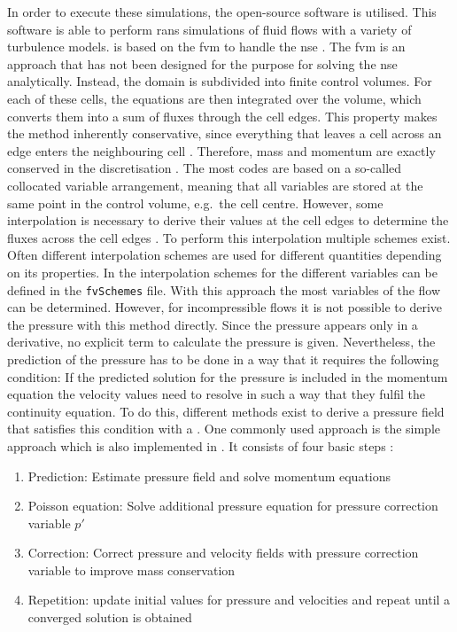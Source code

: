 In order to execute these simulations, the open-source software  is utilised. 
This software is able to perform \acrshort{rans} simulations of fluid flows with a variety of turbulence models. 
 is based on the \acrfull{fvm} to handle the \acrshort{nse} \citep{weller_tensorial_1998}.
The \acrshort{fvm} is an approach that has not been designed for the purpose for solving the \acrshort{nse} analytically. 
Instead, the domain is subdivided into finite control volumes.
For each of these cells, the equations are then integrated over the volume, which converts them into a sum of fluxes through the cell edges.
This property makes the method inherently conservative, since everything that leaves a cell across an edge enters the neighbouring cell \citep{moukalled_finite_2016}. 
Therefore, mass and momentum are exactly conserved in the discretisation \citep{weller_tensorial_1998}.
The most codes are based on a so-called collocated variable arrangement, meaning that all variables are stored at the same point in the control volume, e.g.~the cell centre.
However, some interpolation is necessary to derive their values at the cell edges to determine the fluxes across the cell edges \citep{schlatter_lecture_2025}.
To perform this interpolation multiple schemes exist.
Often different interpolation schemes are used for different quantities depending on its properties.
In  the interpolation schemes for the different variables can be defined in the \texttt{fvSchemes} file.
With this approach the most variables of the flow can be determined.
However, for incompressible flows it is not possible to derive the pressure with this method directly.
Since the pressure appears only in a derivative, no explicit term to calculate the pressure is given.
Nevertheless, the prediction of the pressure has to be done in a way that it requires the following condition:
If the predicted solution for the pressure is included in the momentum equation the velocity values need to resolve in such a way that they fulfil the continuity equation.
To do this, different methods exist to derive a pressure field that satisfies this condition with a  \citep{schlatter_lecture_2025, weller_tensorial_1998}.
One commonly used approach is the \acrfull{simple} approach which is also implemented in .
It consists of four basic steps \citep{schlatter_lecture_2025}:
\begin{enumerate}
    \item Prediction: Estimate pressure field and solve momentum equations
    \item Poisson equation: Solve additional pressure equation for pressure correction variable $p'$
    \item Correction: Correct pressure and velocity fields with pressure correction variable to improve mass conservation
    \item Repetition: update initial values for pressure and velocities and repeat until a converged solution is obtained
\end{enumerate}

